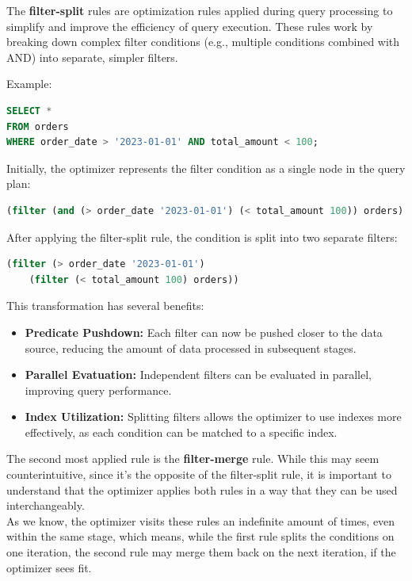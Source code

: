 \documentclass[a4paper,12pt]{scrreprt}
\begin{document}
The \textbf{filter-split} rules are optimization rules applied during query processing to simplify and improve the efficiency of query execution. These rules work by breaking down complex filter conditions (e.g., multiple conditions combined with AND) into separate, simpler filters. 

Example:
\begin{lstlisting}[language=SQL]
SELECT * 
FROM orders 
WHERE order_date > '2023-01-01' AND total_amount < 100;
\end{lstlisting}

Initially, the optimizer represents the filter condition as a single node in the query plan:
\begin{lstlisting}[language=SQL]
(filter (and (> order_date '2023-01-01') (< total_amount 100)) orders)
\end{lstlisting}

After applying the filter-split rule, the condition is split into two separate filters:

\begin{lstlisting}[language=SQL]
(filter (> order_date '2023-01-01') 
    (filter (< total_amount 100) orders))
\end{lstlisting}

This transformation has several benefits:
\begin{itemize}
    \item \textbf{Predicate Pushdown:} Each filter can now be pushed closer to the data source, reducing the amount of data processed in subsequent stages.
    \item \textbf{Parallel Evatuation:} Independent filters can be evaluated in parallel, improving query performance.
    \item \textbf{Index Utilization:} Splitting filters allows the optimizer to use indexes more effectively, as each condition can be matched to a specific index.
\end{itemize}

The second most applied rule is the \textbf{filter-merge} rule. While this may seem counterintuitive, since it's the opposite of the filter-split rule, it is important to understand that the optimizer applies both rules in a way that they can be used interchangeably. \\
As we know, the optimizer visits these rules an indefinite amount of times, even within the same stage, which means, while the first rule splits the conditions on one iteration, the second rule may merge them back on the next iteration, if the optimizer sees fit. 
\end{document}
